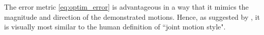\documentclass[letterpaper, 10 pt, conference,fleqn]{ieeeconf}
\begin{document}


The error metric \eqref{eq:optim_error} is advantageous in a way that it mimics the magnitude and direction of the demonstrated motions. Hence, as suggested by \cite{gielniak2010stylized}, it is visually most similar to the human definition of ``joint motion style".




\end{document}
